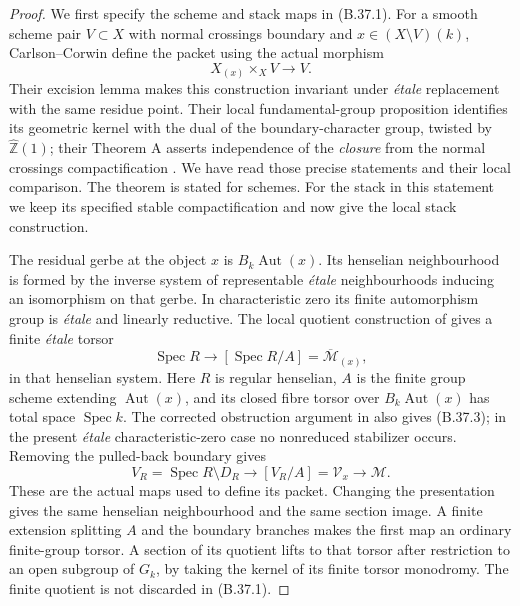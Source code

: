 \documentclass[11pt,oneside]{article}
\begin{document}
\begin{proof}
We first specify the scheme and stack maps in (B.37.1).
For a smooth scheme pair $V\subset X$ with normal crossings
boundary and $x\in(X\setminus V)(k)$, Carlson--Corwin define
the packet using the actual morphism
\[
 X_{(x)}\times_X V\longrightarrow V.
 \tag{B.37.2}
\]
Their excision lemma makes this construction invariant under
\emph{\'etale} replacement with the same residue point.
Their local fundamental-group proposition identifies its
geometric kernel with the dual of the boundary-character
group, twisted by $\widehat{\mathbb Z}(1)$; their Theorem A
asserts independence of the \emph{closure} from the normal
crossings compactification \cite{B_CarlsonCorwin}.
We have read those precise statements and their local
comparison. The theorem is stated for schemes. For the
stack in this statement we keep its specified stable
compactification and now give the local stack construction.

The residual gerbe at the object $x$ is
$B_k\operatorname{Aut}(x)$. Its henselian neighbourhood
is formed by the inverse system of representable
\emph{\'etale} neighbourhoods inducing an isomorphism on
that gerbe. In characteristic zero its finite automorphism
group is \emph{\'etale} and linearly reductive. The local
quotient construction of
\cite[Theorem 3.2 and Proposition 3.6, Step 1]{B_AOV}
gives a finite \emph{\'etale} torsor
\[
 \operatorname{Spec}R\longrightarrow
 [\operatorname{Spec}R/A]
       =\overline{\mathcal M}_{(x)},
 \tag{B.37.3}
\]
in that henselian system. Here $R$ is regular henselian,
$A$ is the finite group scheme extending
$\operatorname{Aut}(x)$, and its closed fibre torsor
over $B_k\operatorname{Aut}(x)$ has total space
$\operatorname{Spec}k$. The corrected obstruction argument
in \cite{B_AOVCorrigendum} also gives (B.37.3); in the
present \emph{\'etale} characteristic-zero case no
nonreduced stabilizer occurs. Removing the pulled-back
boundary gives
\[
 V_R=\operatorname{Spec}R\setminus D_R
       \longrightarrow [V_R/A]=\mathcal V_x
       \longrightarrow\mathcal M.
 \tag{B.37.4}
\]
These are the actual maps used to define its packet.
Changing the presentation gives the same henselian
neighbourhood and the same section image. A finite
extension splitting $A$ and the boundary branches makes
the first map an ordinary finite-group torsor. A section
of its quotient lifts to that torsor after restriction to
an open subgroup of $G_k$, by taking the kernel of its
finite torsor monodromy. The finite quotient is not
discarded in (B.37.1).


\end{proof}
\end{document}
